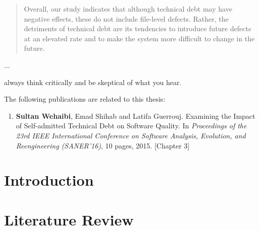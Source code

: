\documentclass[12pt]{report}
\begin{document}
\begin{abstract}
Overall, our study indicates that although technical debt may have negative effects, these do not include file-level defects. Rather, the detriments of technical debt are its tendencies to introduce future defects at an elevated rate and to make the system more difficult to change in the future.



\end{abstract}



\begin{acknowledgments}

...

\end{acknowledgments}




\begin{dedication}
	\begin{flushright}
	always think critically and be skeptical of what you hear.\\
	\end{flushright}
\end{dedication}

\begin{publications}

The following publications are related to this thesis:

\begin{enumerate}

\item \textbf{Sultan Wehaibi}, Emad Shihab and Latifa Guerrouj. Examining the Impact of Self-admitted Technical Debt on Software Quality. In \textit{Proceedings of the 23rd IEEE International Conference on Software Analysis, Evolution, and Reengineering (SANER’16)}, 10 pages, 2015. [Chapter 3]


\end{enumerate}

\end{publications}

\chapter{Introduction}
\label{introduction}


\chapter{Literature Review}
\label{literature_review}

\end{document}
